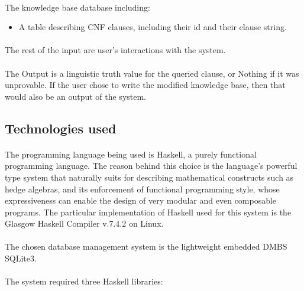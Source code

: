 \documentclass[26pt,fleqn,]{article}
\begin{document}
\paragraph{}The knowledge base database including:

\begin{itemize}
\item A table describing CNF clauses, including their id and their clause string. 
\end{itemize}

\paragraph{} The rest of the input are user's interactions with the system.
\paragraph{} The Output is a linguistic truth value for the queried clause, or Nothing if it was unprovable. If the user chose to write the modified knowledge base, then that would also be an output of the system.


\subsection{Technologies used}

\paragraph{}The programming language being used is Haskell, a purely functional programming language. The reason behind this choice is the language's powerful type system that naturally suits for describing mathematical constructs such as hedge algebras, and its enforcement of functional programming style, whose expressiveness can enable the design of very modular and even composable programs. The particular implementation of Haskell used for this system is the Glasgow  Haskell Compiler v.7.4.2 on Linux.

\paragraph{}The chosen database management system is the lightweight embedded DMBS SQLite3. 

\paragraph{}The system required three Haskell libraries: 
\end{document}
